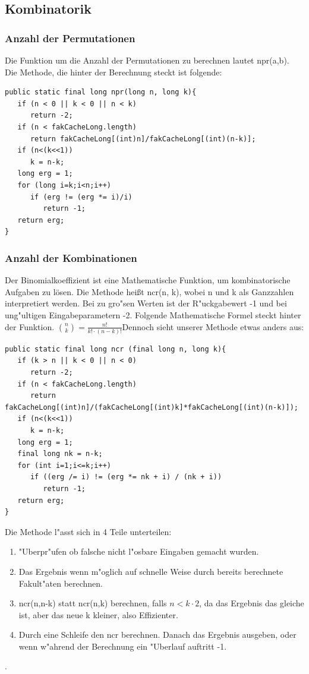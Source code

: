 \documentclass{scrartcl}
\begin{document}
\subsection{Kombinatorik}
\subsubsection{Anzahl der Permutationen}
Die Funktion um die Anzahl der Permutationen zu berechnen lautet npr(a,b). Die Methode, die hinter der Berechnung steckt ist folgende:\newline
\begin{minipage}{\textwidth}
\begin{lstlisting}     
public static final long npr(long n, long k){
   if (n < 0 || k < 0 || n < k)
      return -2;
   if (n < fakCacheLong.length)
      return fakCacheLong[(int)n]/fakCacheLong[(int)(n-k)];
   if (n<(k<<1))
      k = n-k;
   long erg = 1;
   for (long i=k;i<n;i++)
      if (erg != (erg *= i)/i)
         return -1;
   return erg;
}
\end{lstlisting} 
\end{minipage}
\subsubsection{Anzahl der Kombinationen}
Der Binomialkoeffizient ist eine Mathematische Funktion, um kombinatorische Aufgaben zu l\"osen. Die Methode hei\ss{}t  ncr(n, k), wobei n und k als 
Ganzzahlen interpretiert werden. Bei zu gro"sen Werten ist der R"uckgabewert -1 und bei ung"ultigen Eingabeparametern -2. Folgende Mathematische Formel steckt hinter der Funktion.\newline
 $ {n \choose k} = \frac {n!} {k! \cdot (n-k)!}  $\newline Dennoch sieht unserer Methode etwas anders aus:\newline
\begin{minipage}{\textwidth}
\begin{lstlisting}     
public static final long ncr (final long n, long k){
   if (k > n || k < 0 || n < 0)
      return -2;
   if (n < fakCacheLong.length)
      return fakCacheLong[(int)n]/(fakCacheLong[(int)k]*fakCacheLong[(int)(n-k)]);
   if (n<(k<<1))
      k = n-k;
   long erg = 1;
   final long nk = n-k;
   for (int i=1;i<=k;i++)
      if ((erg /= i) != (erg *= nk + i) / (nk + i))
         return -1;
   return erg;
}
\end{lstlisting} 
\end{minipage}
Die Methode l"asst sich in 4 Teile unterteilen: 
\begin{enumerate}  
\item "Uberpr"ufen ob falsche nicht l"osbare Eingaben gemacht wurden.  
\item Das Ergebnis wenn m"oglich auf schnelle Weise durch bereits berechnete Fakult"aten berechnen.  
\item ncr(n,n-k) statt ncr(n,k) berechnen, falls \(n<k \cdot 2\), da  das Ergebnis das gleiche ist, aber das neue k kleiner, also Effizienter.  
\item Durch eine Schleife den ncr berechnen. Danach das Ergebnis ausgeben, oder wenn w"ahrend der Berechnung ein "Uberlauf auftritt -1. 
\end{enumerate}.
\end{document}
